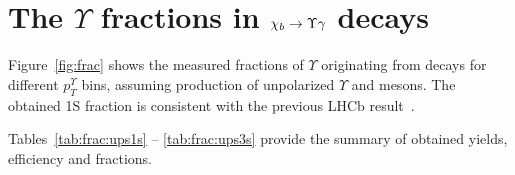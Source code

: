 \section{The \texorpdfstring{$\Upsilon$}{Y} fractions in \texorpdfstring{$\chi_{b} \rightarrow \Upsilon \gamma$}{chib --> Y gamma} decays}
\label{sec:mc}

Figure~\ref{fig:frac} shows the measured fractions of $\Upsilon$ originating
from \chib decays for different $p_T^{\Upsilon}$ bins,  assuming production of
unpolarized $\Upsilon$ and \chib mesons. The obtained \Y1S fraction is
consistent with the previous LHCb result~\cite{LHCb-PAPER-2012-015}.



Tables~\ref{tab:frac:ups1s} -- \ref{tab:frac:ups3s} provide the summary
of obtained yields, efficiency and fractions.

